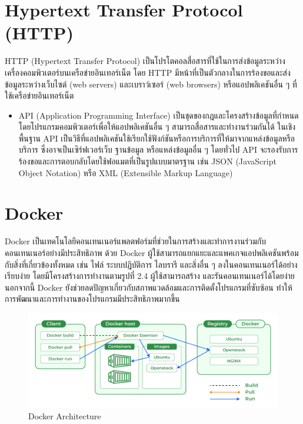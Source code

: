 \section{Hypertext Transfer Protocol (HTTP)}
HTTP (Hypertext Transfer Protocol) เป็นโปรโตคอลสื่อสารที่ใช้ในการส่งข้อมูลระหว่างเครื่องคอมพิวเตอร์บนเครือข่ายอินเทอร์เน็ต โดย HTTP 
มีหน้าที่เป็นตัวกลางในการร้องขอและส่งข้อมูลระหว่างเว็บไซต์ (web servers) และเบราว์เซอร์ (web browsers) หรือแอปพลิเคชันอื่น ๆ 
ที่ใช้เครือข่ายอินเทอร์เน็ต 
\begin{itemize}
  \item API (Application Programming Interface) เป็นชุดของกฎและโครงสร้างข้อมูลที่กำหนดโดยโปรแกรมคอมพิวเตอร์เพื่อให้แอปพลิเคชันอื่น ๆ 
  สามารถสื่อสารและทำงานร่วมกันได้ ในเชิงพื้นฐาน API เป็นวิธีที่แอปพลิเคชันใช้เรียกใช้ฟังก์ชันหรือการบริการที่ให้มาจากแหล่งข้อมูลหรือบริการ
  ซึ่งอาจเป็นเซิร์ฟเวอร์เว็บ ฐานข้อมูล หรือแหล่งข้อมูลอื่น ๆ โดยทั่วไป API จะรองรับการร้องขอและการตอบกลับโดยใช้ฟอแมตที่เป็นรูปแบบมาตรฐาน เช่น 
  JSON (JavaScript Object Notation) หรือ XML (Extensible Markup Language) 
\end{itemize}

\section{Docker}
Docker \cite{docker} เป็นเทคโนโลยีคอนเทนเนอร์แพลตฟอร์มที่ช่วยในการสร้างและทำการงานร่วมกับคอนเทนเนอร์อย่างมีประสิทธิภาพ ด้วย Docker 
ผู้ใช้สามารถแยกแยะและแพคเกจแอปพลิเคชันพร้อมกับสิ่งที่เกี่ยวข้องทั้งหมด เช่น ไฟล์ ระบบปฏิบัติการ ไลบรารี และสิ่งอื่น ๆ 
ลงในคอนเทนเนอร์ได้อย่างเรียบง่าย โดยมีโครงสร้างการทำงานตามรูปที่ 2.4 ผู้ใช้สามารถสร้าง และรันคอนเทนเนอร์ได้โดยง่าย นอกจากนี้ Docker 
ยังช่วยลดปัญหาเกี่ยวกับสภาพแวดล้อมและการติดตั้งโปรแกรมที่ซับซ้อน ทำให้การพัฒนาและการทำงานของโปรแกรมมีประสิทธิภาพมากขึ้น 
\begin{figure}[ht]
  \begin{center}
  \includegraphics[scale=0.3]{resources/Docker.png}
  \end{center}
  \caption[Docker Architecture]{Docker Architecture}
  \label{fig:docker}
\end{figure}

